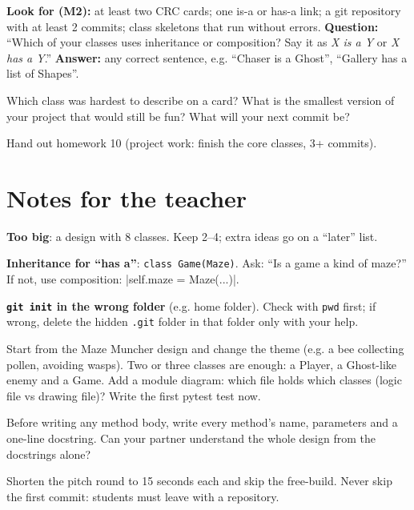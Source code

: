 \begin{formativecheck}
\textbf{Look for (M2):} at least two CRC cards; one is-a or has-a link; a git repository with at least 2 commits; class skeletons that run without errors.
\textbf{Question:} \enquote{Which of your classes uses inheritance or composition? Say it as \emph{X is a Y} or \emph{X has a Y}.}
\textbf{Answer:} any correct sentence, e.g. \enquote{Chaser is a Ghost}, \enquote{Gallery has a list of Shapes}.
\end{formativecheck}

\begin{reflection}
Which class was hardest to describe on a card? What is the smallest version of your project that would still be fun? What will your next commit be?
\end{reflection}

Hand out homework 10 (project work: finish the core classes, 3+ commits).

\section{Notes for the teacher}
\begin{commonmistakes}
  \item \textbf{Too big}: a design with 8 classes. Keep 2--4; extra ideas go on a \enquote{later} list.
  \item \textbf{Inheritance for \enquote{has a}}: \texttt{class Game(Maze)}. Ask: \enquote{Is a game a kind of maze?} If not, use composition: \py|self.maze = Maze(...)|.
  \item \textbf{\texttt{git init} in the wrong folder} (e.g. home folder). Check with \texttt{pwd} first; if wrong, delete the hidden \texttt{.git} folder in that folder only with your help.
\end{commonmistakes}

\begin{differentiation}
\supportpath Start from the Maze Muncher design and change the theme (e.g. a bee collecting pollen, avoiding wasps). Two or three classes are enough: a Player, a Ghost-like enemy and a Game.
\extensionpath Add a module diagram: which file holds which classes (logic file vs drawing file)? Write the first pytest test now.
\end{differentiation}

\begin{stretchchallenge}
Before writing any method body, write every method's name, parameters and a one-line docstring. Can your partner understand the whole design from the docstrings alone?
\end{stretchchallenge}

\begin{teachernote}
Shorten the pitch round to 15 seconds each and skip the free-build. Never skip the first commit: students must leave with a repository.
\end{teachernote}
